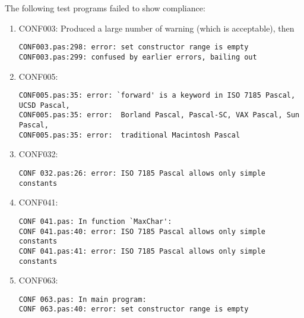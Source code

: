 \documentclass[a4paper]{article}
\begin{document}
The following test programs failed to show compliance:
\begin{enumerate}
    
    \item CONF003: Produced a large number of warning (which is acceptable), then
         \begin{small}\begin{verbatim}
CONF003.pas:298: error: set constructor range is empty
CONF003.pas:299: confused by earlier errors, bailing out
          \end{verbatim}\end{small}

    \item CONF005:
        \begin{small}\begin{verbatim}
CONF005.pas:35: error: `forward' is a keyword in ISO 7185 Pascal, UCSD Pascal,
CONF005.pas:35: error:  Borland Pascal, Pascal-SC, VAX Pascal, Sun Pascal,
CONF005.pas:35: error:  traditional Macintosh Pascal
         \end{verbatim}\end{small}

    \item CONF032:
        \begin{small}\begin{verbatim}
CONF 032.pas:26: error: ISO 7185 Pascal allows only simple constants
        \end{verbatim}\end{small}

    \item CONF041:
        \begin{small}\begin{verbatim}
CONF 041.pas: In function `MaxChar':
CONF 041.pas:40: error: ISO 7185 Pascal allows only simple constants
CONF 041.pas:41: error: ISO 7185 Pascal allows only simple constants
        \end{verbatim}\end{small}

    \item CONF063:
        \begin{small}\begin{verbatim}
CONF 063.pas: In main program:
CONF 063.pas:40: error: set constructor range is empty
        \end{verbatim}\end{small}


\end{enumerate}
\end{document}
